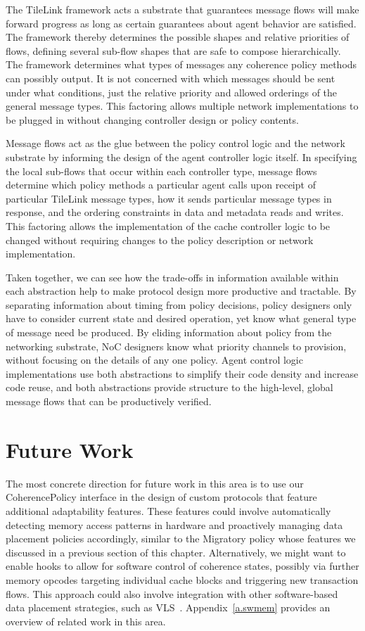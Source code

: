 The TileLink framework acts a substrate that guarantees message flows will make forward progress
as long as certain guarantees about agent behavior are satisfied.
The framework thereby determines the possible shapes and relative priorities of flows,
defining several sub-flow shapes that are safe to compose hierarchically.
The framework determines what types of messages any coherence policy methods can possibly output.
It is not concerned with which messages should be sent under what conditions,
just the relative priority and allowed orderings of the general message types.
This factoring allows multiple network implementations to be plugged in without changing controller design
or policy contents.

Message flows act as the glue between the policy control logic and
the network substrate by informing the design of the agent controller logic itself.
In specifying the local sub-flows that occur within each controller type, message flows determine
which policy methods a particular agent calls upon receipt of particular TileLink message types,
how it sends particular message types in response,
and the ordering constraints in data and metadata reads and writes.
This factoring allows the implementation of the cache controller logic
to be changed without requiring changes to the policy description or network implementation.

Taken together, we can see how the trade-offs in information available within each abstraction
help to make protocol design more productive and tractable.
By separating information about timing from policy decisions, policy designers only have to consider
current state and desired operation, yet know what general type of message need be produced.
By eliding information about policy from the networking substrate, NoC designers know what priority channels to provision, without focusing on the details of any one policy.
Agent control logic implementations use both abstractions to simplify their code density and increase code reuse, and
both abstractions provide structure to the high-level, global message flows that can be productively verified.

\section{Future Work}

The most concrete direction for future work in this area is to use our CoherencePolicy interface
in the design of custom protocols that feature additional adaptability features.
These features could involve automatically detecting memory access patterns in hardware
and proactively managing data placement policies accordingly, similar to 
the Migratory policy whose features we discussed in a previous section of this chapter.
Alternatively, we might want to enable hooks to allow for software control of coherence states,
possibly via further memory opcodes targeting individual cache blocks and triggering new transaction flows.
This approach could also involve integration with other software-based data placement strategies, such as VLS~\cite{Cook:EECS-2009-131}.
Appendix~\ref{a.swmem} provides an overview of related work in this area.

